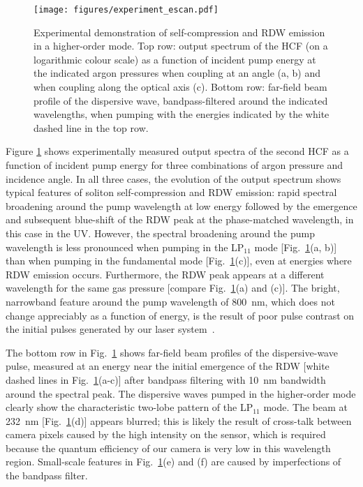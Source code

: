 \documentclass[amsmath, preprint, floatfix]{revtex4-2}
\begin{document}
\begin{figure}
    \centering
    \texttt{[image: figures/experiment\_escan.pdf]}
    \caption{Experimental demonstration of self-compression and RDW emission in a higher-order mode. Top row: output spectrum of the HCF (on a logarithmic colour scale) as a function of incident pump energy at the indicated argon pressures when coupling at an angle (a, b) and when coupling along the optical axis (c). Bottom row: far-field beam profile of the dispersive wave, bandpass-filtered around the indicated wavelengths, when pumping with the energies indicated by the white dashed line in the top row.}
    \label{fig:exp_escan}
\end{figure}

Figure \ref{fig:exp_escan} shows experimentally measured output spectra of the second HCF as a function of incident pump energy for three combinations of argon pressure and incidence angle. In all three cases, the evolution of the output spectrum shows typical features of soliton self-compression and RDW emission: rapid spectral broadening around the pump wavelength at low energy followed by the emergence and subsequent blue-shift of the RDW peak at the phase-matched wavelength, in this case in the UV. However, the spectral broadening around the pump wavelength is less pronounced when pumping in the LP$_{11}$ mode [Fig.~\ref{fig:exp_escan}(a, b)] than when pumping in the fundamental mode [Fig.~\ref{fig:exp_escan}(c)], even at energies where RDW emission occurs. Furthermore, the RDW peak appears at a different wavelength for the same gas pressure [compare Fig.~\ref{fig:exp_escan}(a) and (c)]. The bright, narrowband feature around the pump wavelength of \SI{800}{\nm}, which does not change appreciably as a function of energy, is the result of poor pulse contrast on the initial pulses generated by our laser system~\cite{brahms_high-energy_2019}.

The bottom row in Fig.~\ref{fig:exp_escan} shows far-field beam profiles of the dispersive-wave pulse, measured at an energy near the initial emergence of the RDW [white dashed lines in Fig.~\ref{fig:exp_escan}(a-c)] after bandpass filtering with \SI{10}{\nm} bandwidth around the spectral peak. The dispersive waves pumped in the higher-order mode clearly show the characteristic two-lobe pattern of the LP$_{11}$ mode. The beam at \SI{232}{\nm} [Fig.~\ref{fig:exp_escan}(d)] appears blurred; this is likely the result of cross-talk between camera pixels caused by the high intensity on the sensor, which is required because the quantum efficiency of our camera is very low in this wavelength region. Small-scale features in Fig.~\ref{fig:exp_escan}(e) and (f) are caused by imperfections of the bandpass filter.
\end{document}
